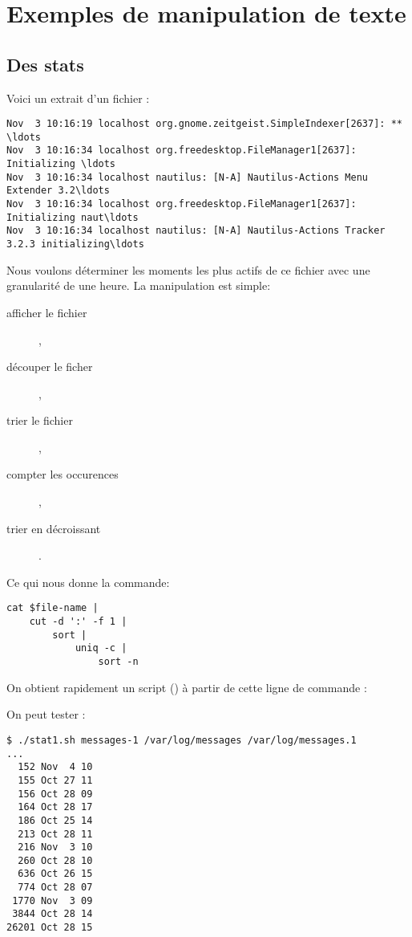 
\section{Exemples de manipulation de texte}

\subsection{Des stats}
Voici un extrait d'un fichier :

\begin{lstlisting}
Nov  3 10:16:19 localhost org.gnome.zeitgeist.SimpleIndexer[2637]: ** \ldots
Nov  3 10:16:34 localhost org.freedesktop.FileManager1[2637]: Initializing \ldots
Nov  3 10:16:34 localhost nautilus: [N-A] Nautilus-Actions Menu Extender 3.2\ldots
Nov  3 10:16:34 localhost org.freedesktop.FileManager1[2637]: Initializing naut\ldots
Nov  3 10:16:34 localhost nautilus: [N-A] Nautilus-Actions Tracker 3.2.3 initializing\ldots
\end{lstlisting}

Nous voulons déterminer les moments les plus actifs de ce fichier avec une granularité de une heure. La manipulation est simple:

\begin{description}
    \item[afficher le fichier] ,
    \item[découper le ficher] ,
    \item[trier le fichier] ,
    \item[compter les occurences] ,
    \item[trier en décroissant] .
\end{description}

Ce qui nous donne la commande:

\begin{lstlisting}
cat $file-name |
    cut -d ':' -f 1 |
        sort |
            uniq -c |
                sort -n
\end{lstlisting}

On obtient rapidement un script () à partir de cette ligne de com\-man\-de :



On peut tester :

\begin{lstlisting}
$ ./stat1.sh messages-1 /var/log/messages /var/log/messages.1
...
  152 Nov  4 10
  155 Oct 27 11
  156 Oct 28 09
  164 Oct 28 17
  186 Oct 25 14
  213 Oct 28 11
  216 Nov  3 10
  260 Oct 28 10
  636 Oct 26 15
  774 Oct 28 07
 1770 Nov  3 09
 3844 Oct 28 14
26201 Oct 28 15
\end{lstlisting}

